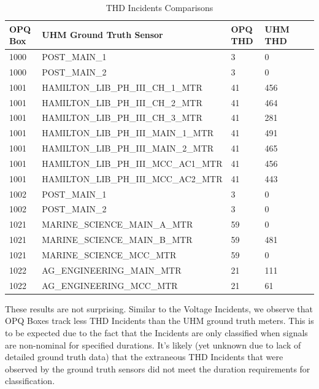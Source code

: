 \begin{table}[H]
    \centering
    \caption{THD Incidents Comparisons}
    \begin{tabularx}{\textwidth}{lXllll}
        \toprule
        \textbf{OPQ Box} & \textbf{UHM Ground Truth Sensor} & \textbf{OPQ THD} & \textbf{UHM THD} \\
        \midrule
        1000 & POST\_MAIN\_1 & 3 & 0 \\
        1000 & POST\_MAIN\_2 & 3 & 0 \\
        1001 & HAMILTON\_LIB\_PH\_III\_CH\_1\_MTR & 41 & 456 \\
        1001 & HAMILTON\_LIB\_PH\_III\_CH\_2\_MTR & 41 & 464 \\
        1001 & HAMILTON\_LIB\_PH\_III\_CH\_3\_MTR & 41 & 281 \\
        1001 & HAMILTON\_LIB\_PH\_III\_MAIN\_1\_MTR & 41 & 491 \\
        1001 & HAMILTON\_LIB\_PH\_III\_MAIN\_2\_MTR & 41 & 465 \\
        1001 & HAMILTON\_LIB\_PH\_III\_MCC\_AC1\_MTR & 41 & 456 \\
        1001 & HAMILTON\_LIB\_PH\_III\_MCC\_AC2\_MTR & 41 & 443 \\
        1002 & POST\_MAIN\_1 & 3 & 0 \\
        1002 & POST\_MAIN\_2 & 3 & 0 \\
        1021 & MARINE\_SCIENCE\_MAIN\_A\_MTR & 59 & 0 \\
        1021 & MARINE\_SCIENCE\_MAIN\_B\_MTR & 59 & 481 \\
        1021 & MARINE\_SCIENCE\_MCC\_MTR & 59 & 0 \\
        1022 & AG\_ENGINEERING\_MAIN\_MTR & 21 & 111 \\
        1022 & AG\_ENGINEERING\_MCC\_MTR & 21 & 61 \\
        \bottomrule
    \end{tabularx}
    \label{table:gt_thd_incidents}
\end{table}

These results are not surprising. Similar to the Voltage Incidents, we observe that OPQ Boxes track less THD Incidents than the UHM ground truth meters. This is to be expected due to the fact that the Incidents are only classified when signals are non-nominal for specified durations. It's likely (yet unknown due to lack of detailed ground truth data) that the extraneous THD Incidents that were observed by the ground truth sensors did not meet the duration requirements for classification.

